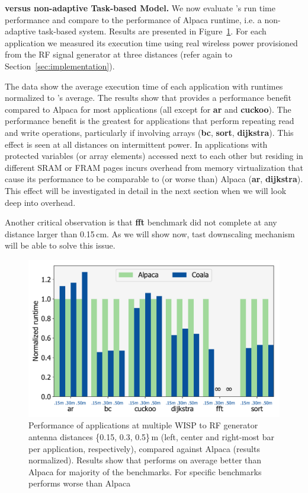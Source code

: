 \textbf{\sys versus non-adaptive Task-based Model.} We now evaluate \sys's run time performance and compare \sys to the performance of Alpaca runtime, i.e. a non-adaptive task-based system. Results are presented in Figure~\ref{fig:runtime}. For each application we measured its execution time using real wireless power provisioned from the RF signal generator at three distances (refer again to Section~\ref{sec:implementation}).

The data show the average execution time of each application with runtimes normalized to \sys's average.  The results show that \sys provides a performance benefit compared to Alpaca for most applications (all except for \textbf{ar} and \textbf{cuckoo}). The performance benefit is the greatest for applications that perform repeating read and write operations, particularly if involving arrays (\textbf{bc}, \textbf{sort}, \textbf{dijkstra}). This effect is seen at all distances on intermittent power. In applications with protected variables (or array elements) accessed next to each other but residing in different SRAM or FRAM pages \sys incurs overhead from memory virtualization that cause its performance to be comparable to (or worse than) Alpaca (\textbf{ar}, \textbf{dijkstra}). This effect will be investigated in detail in the next section when we will look deep into \sys overhead. 

Another critical observation is that \textbf{fft} benchmark did not complete at any distance larger than 0.15\,cm. As we will show now, \sys tast downscaling mechanism will be able to solve this issue.  

\begin{figure}
	\centering
	\includegraphics[width=\columnwidth]{figures/coala_alpaca_gcc}
	\caption{Performance of \sys applications at multiple WISP to RF generator antenna distances \{0.15, 0.3, 0.5\}\,m (left, center and right-most bar per application, respectively), compared against Alpaca (results normalized). Results show that \sys performs on average better than Alpaca for majority of the benchmarks. For specific benchmarks \sys performs worse than Alpaca }
	\label{fig:runtime}
\end{figure}

